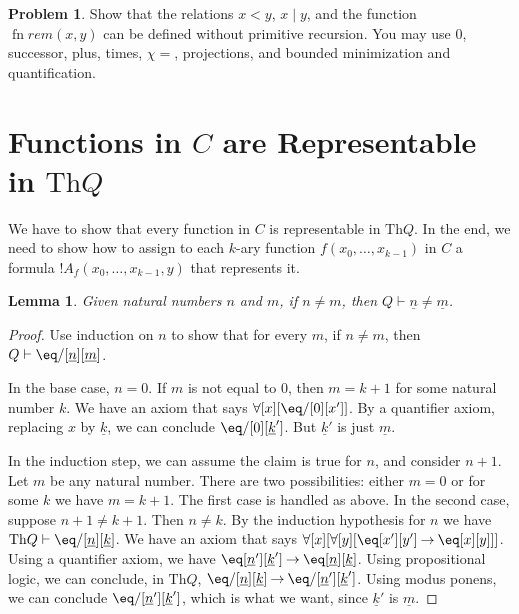 \documentclass[10pt,a4paper]{article}
\theoremstyle{plain}
\newtheorem{lem}[thm]{Lemma}
\theoremstyle{definition}
\newtheorem{prob}{Problem}[section]
\theoremstyle{remark}
\newcommand*{\olfileid}[3]{}
\newcommand*{\olsection}[1]{\section*{#1}}
\providecommand{\lif}{\mathbin{\rightarrow}}
\providecommand{\lforall}{\mathord{\forall}}
\providecommand{\Proves}{\mathrel{\vdash}}
\providecommand{\Th}{\ensuremath{\mathrm{Th}}}
\providecommand{\num}[1]{\underline{#1}}
\providecommand{\Char}{\chi}
\providecommand{\fn}{\operatorname{fn}}
\begin{document}
\begin{prob}
  Show that the relations $x < y$, $x \mid y$, and the
  function~$\fn{rem}(x,y)$ can be defined without primitive recursion.
  You may use $0$, successor, plus, times, $\Char{=}$, projections,
  and bounded minimization and quantification.
\end{prob}





\olfileid{inc}{req}{cre}
\olsection{Functions in $C$ are Representable in $\Th{Q}$}

We have to show that every function in $C$ is representable in
$\Th{Q}$. In the end, we need to show how to assign to each $k$-ary
function $f(x_0,\dots,x_{k-1})$ in $C$ a formula
$!A_f(x_0,\dots,x_{k-1},y)$ that represents it.

\begin{lem}
Given natural numbers $n$ and $m$, if $n \neq m$, then $Q \Proves \num
n \neq \num m$.
\end{lem}

\begin{proof}
Use induction on $n$ to show that for every $m$, if $n \neq m$, then
$Q \Proves \eq/[\num n][\num m]$.

In the base case, $n = 0$. If $m$ is not equal to $0$, then $m = k +
1$ for some natural number $k$. We have an axiom that says
$\lforall[x][\eq/[0][x']]$. By a quantifier axiom, replacing $x$ by
  $\num k$, we can conclude $\eq/[0][\num k']$. But $\num k'$ is just
  $\num m$.

In the induction step, we can assume the claim is true for $n$, and
consider $n+1$. Let $m$ be any natural number. There are two
possibilities: either $m = 0$ or for some $k$ we have $m = k+1$. The
first case is handled as above. In the second case, suppose $n+1 \neq
k+1$. Then $n \neq k$. By the induction hypothesis for $n$ we have
$\Th{Q} \Proves \eq/[\num n][\num k]$. We have an axiom that says
$\lforall[x][\lforall[y][\eq[x'][y'] \lif \eq[x][y]]]$. Using a
quantifier axiom, we have $\eq[\num n'][\num k'] \lif \eq[\num n][\num
  k]$. Using propositional logic, we can conclude, in $\Th{Q}$,
$\eq/[\num n][\num k] \lif \eq/[\num n'][\num k']$. Using modus
ponens, we can conclude $\eq/[\num n'][\num k']$, which is what we want,
since $\num k'$ is $\num m$.
\end{proof}
\end{document}
